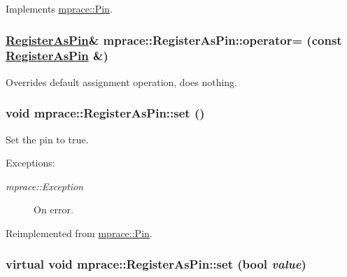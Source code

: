 Implements \hyperlink{classmprace_1_1Pin_a2}{mprace::Pin}.\hypertarget{classmprace_1_1RegisterAsPin_b1}{
\subsubsection[operator=]{\setlength{\rightskip}{0pt plus 5cm}\hyperlink{classmprace_1_1RegisterAsPin}{Register\-As\-Pin}\& mprace::Register\-As\-Pin::operator= (const \hyperlink{classmprace_1_1RegisterAsPin}{Register\-As\-Pin} \&)}}
\label{classmprace_1_1RegisterAsPin_b1}


Overrides default assignment operation, does nothing. 

\hypertarget{classmprace_1_1RegisterAsPin_a4}{
\subsubsection[set]{\setlength{\rightskip}{0pt plus 5cm}void mprace::Register\-As\-Pin::set ()}}
\label{classmprace_1_1RegisterAsPin_a4}


Set the pin to true. 

\begin{Desc}
\item[Exceptions:]
\begin{description}
\item[{\em mprace::Exception}]On error.\end{description}
\end{Desc}


Reimplemented from \hyperlink{classmprace_1_1Pin_a3}{mprace::Pin}.\hypertarget{classmprace_1_1RegisterAsPin_a2}{
\subsubsection[set]{\setlength{\rightskip}{0pt plus 5cm}virtual void mprace::Register\-As\-Pin::set (bool {\em value})}}
\label{classmprace_1_1RegisterAsPin_a2}



